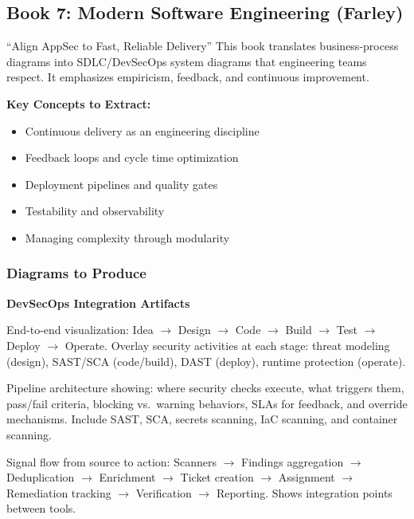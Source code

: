 \documentclass[11pt,letterpaper]{article}
\begin{document}
\subsection{Book 7: Modern Software Engineering (Farley)}

\begin{bookbox}{``Align AppSec to Fast, Reliable Delivery''}
This book translates business-process diagrams into SDLC/DevSecOps system diagrams that engineering teams respect. It emphasizes empiricism, feedback, and continuous improvement.

\vspace{0.5cm}

\textbf{Key Concepts to Extract:}
\begin{itemize}[nosep]
    \item Continuous delivery as an engineering discipline
    \item Feedback loops and cycle time optimization
    \item Deployment pipelines and quality gates
    \item Testability and observability
    \item Managing complexity through modularity
\end{itemize}
\end{bookbox}

\subsubsection{Diagrams to Produce}

\begin{diagrambox}
\textbf{DevSecOps Integration Artifacts}

\begin{description}[leftmargin=1.5cm, style=nextline]
    \item[Secure SDLC Value Stream]
    End-to-end visualization: Idea $\rightarrow$ Design $\rightarrow$ Code $\rightarrow$ Build $\rightarrow$ Test $\rightarrow$ Deploy $\rightarrow$ Operate. Overlay security activities at each stage: threat modeling (design), SAST/SCA (code/build), DAST (deploy), runtime protection (operate).

    \item[CI/CD Security Gates Diagram]
    Pipeline architecture showing: where security checks execute, what triggers them, pass/fail criteria, blocking vs.\ warning behaviors, SLAs for feedback, and override mechanisms. Include SAST, SCA, secrets scanning, IaC scanning, and container scanning.

    \item[Toolchain Data-Flow Diagram]
    Signal flow from source to action: Scanners $\rightarrow$ Findings aggregation $\rightarrow$ Deduplication $\rightarrow$ Enrichment $\rightarrow$ Ticket creation $\rightarrow$ Assignment $\rightarrow$ Remediation tracking $\rightarrow$ Verification $\rightarrow$ Reporting. Shows integration points between tools.
\end{description}
\end{diagrambox}
\end{document}

